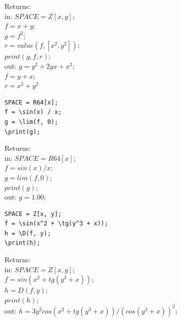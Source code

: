 Returns: \\
in: $SPACE=Z[x, y]; $\\
\hspace*{4mm} $f=x+y;$\\ 
\hspace*{4mm} $g=f^2; $\\
\hspace*{4mm} $r=value(f, [x^2, y^2]); $\\
\hspace*{4mm} $print(g, f, r);$\\
out: $g = y^{2}+2yx+x^{2}; $ \\
\hspace*{4mm} $f = y+x;$ \\ 
\hspace*{4mm} $r=x^2+y^2 $

\vspace*{-3mm}
\begin{verbatim}
SPACE = R64[x];
f = \sin(x) / x;
g = \lim(f, 0);
\print(g);
\end{verbatim}\vspace*{-3mm}

Returns: \\
in: $ SPACE=R64[x]; $\\
\hspace*{4mm} $f=sin(x)/x; $\\
\hspace*{4mm} $g=lim(f, 0); $\\
\hspace*{4mm} $print(g);$\\
out: $g = 1. 00;$

\vspace*{-3mm}
\begin{verbatim}
SPACE = Z[x, y];
f = \sin(x^2 + \tg(y^3 + x));
h = \D(f, y);
\print(h);
\end{verbatim}\vspace*{-3mm}

Returns:\\
in: $SPACE=Z[x, y]; $\\
\hspace*{4mm} $f=sin(x^2+ tg(y^3+x)); $\\
\hspace*{4mm} $h= D(f, y);$\\ 
\hspace*{4mm} $print(h);$\\
out: $h = 3y^2 cos(x^2+tg(y^3+x))/(cos(y^3+x))^2;$

